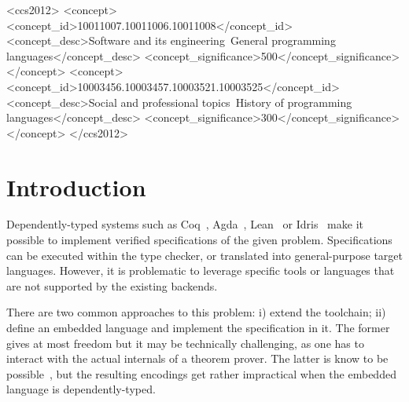 \documentclass[acmsmall,review,anonymous]{acmart}\settopmatter{printfolios=true,printccs=false,printacmref=false}
\begin{document}
\begin{CCSXML}
<ccs2012>
<concept>
<concept_id>10011007.10011006.10011008</concept_id>
<concept_desc>Software and its engineering~General programming languages</concept_desc>
<concept_significance>500</concept_significance>
</concept>
<concept>
<concept_id>10003456.10003457.10003521.10003525</concept_id>
<concept_desc>Social and professional topics~History of programming languages</concept_desc>
<concept_significance>300</concept_significance>
</concept>
</ccs2012>
\end{CCSXML}





\maketitle

\section{Introduction}

Dependently-typed systems such as Coq~\cite{}, Agda~\cite{}, Lean~\cite{}
or Idris~\cite{} make it possible to implement verified specifications
of the given problem.  Specifications can be executed
within the type checker, or translated into
general-purpose target languages.  However, it is problematic to
leverage specific tools or languages that are not supported by the
existing backends.

There are two common approaches to this problem: i) extend the
toolchain; ii) define an embedded language and implement the specification
in it.  The former gives at most freedom but it may be technically
challenging, as one has to interact with the actual internals of a
theorem prover.  The latter is know to be possible~\cite{}, but
the resulting encodings get rather impractical when the embedded
language is dependently-typed.
\end{document}

